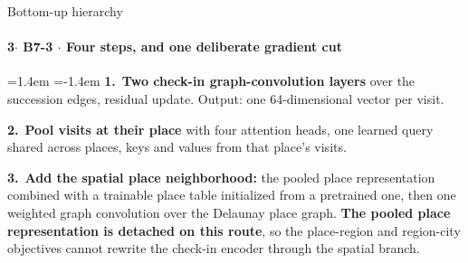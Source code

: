 \documentclass{beamer}
\begin{document}
\begin{frame}[noframenumbering]{Bottom-up hierarchy}
    \framesubtitle{\normalsize 3$\cdot$ \textbf{B7-3} $\cdot$ Four steps, and one deliberate gradient cut}
    \hypertarget{b73}{}
    \hypertarget{b72}{}%
    \small
    \leftskip=1.4em \parindent=-1.4em
    \textbf{1.}~\textbf{Two check-in graph-convolution layers} over the succession edges, residual update. Output: one 64-dimensional vector per visit.\par\vspace{1pt}
    \textbf{2.}~\textbf{Pool visits at their place} with four attention heads, one learned query shared across places, keys and values from that place's visits.\par\vspace{1pt}
    \textbf{3.}~\textbf{Add the spatial place neighborhood:} the pooled place representation combined with a trainable place table initialized from a pretrained one, then one weighted graph convolution over the Delaunay place graph. \textbf{The pooled place representation is detached on this route}, so the place-region and region-city objectives cannot rewrite the check-in encoder through the spatial branch.\par\vspace{1pt}

\end{frame}
\end{document}
